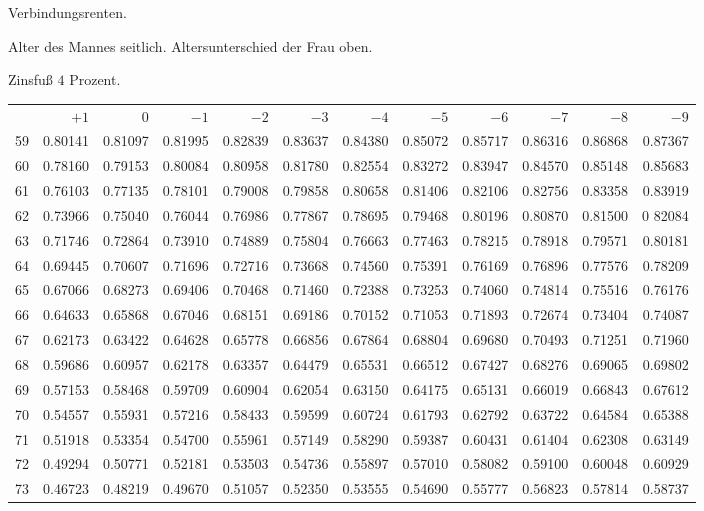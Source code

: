 \clearpage
{}
\begin{center}
Verbindungsrenten.\par\smallskip
Alter des Mannes seitlich. Altersunterschied der Frau oben.\par\smallskip
Zinsfuß \(4\) Prozent.\par\medskip
\fontsize{8}{10}\selectfont\setlength{\tabcolsep}{1.3pt}
\begin{tabular}{|r|rrrrrrrrrrr|}
\hline
&\(+1\)&0&\(-1\)&\(-2\)&\(-3\)&\(-4\)&\(-5\)&\(-6\)&\(-7\)&\(-8\)&\(-9\)\\[8pt]
59&0.80141&0.81097&0.81995&0.82839&0.83637&0.84380&0.85072&0.85717&0.86316&0.86868&0.87367\\
60&0.78160&0.79153&0.80084&0.80958&0.81780&0.82554&0.83272&0.83947&0.84570&0.85148&0.85683\\
61&0.76103&0.77135&0.78101&0.79008&0.79858&0.80658&0.81406&0.82106&0.82756&0.83358&0.83919\\
62&0.73966&0.75040&0.76044&0.76986&0.77867&0.78695&0.79468&0.80196&0.80870&0.81500&0 82084\\
63&0.71746&0.72864&0.73910&0.74889&0.75804&0.76663&0.77463&0.78215&0.78918&0.79571&0.80181\\
64&0.69445&0.70607&0.71696&0.72716&0.73668&0.74560&0.75391&0.76169&0.76896&0.77576&0.78209\\[5pt]
65&0.67066&0.68273&0.69406&0.70468&0.71460&0.72388&0.73253&0.74060&0.74814&0.75516&0.76176\\
66&0.64633&0.65868&0.67046&0.68151&0.69186&0.70152&0.71053&0.71893&0.72674&0.73404&0.74087\\
67&0.62173&0.63422&0.64628&0.65778&0.66856&0.67864&0.68804&0.69680&0.70493&0.71251&0.71960\\
68&0.59686&0.60957&0.62178&0.63357&0.64479&0.65531&0.66512&0.67427&0.68276&0.69065&0.69802\\
69&0.57153&0.58468&0.59709&0.60904&0.62054&0.63150&0.64175&0.65131&0.66019&0.66843&0.67612\\[5pt]
70&0.54557&0.55931&0.57216&0.58433&0.59599&0.60724&0.61793&0.62792&0.63722&0.64584&0.65388\\
71&0.51918&0.53354&0.54700&0.55961&0.57149&0.58290&0.59387&0.60431&0.61404&0.62308&0.63149\\
72&0.49294&0.50771&0.52181&0.53503&0.54736&0.55897&0.57010&0.58082&0.59100&0.60048&0.60929\\
73&0.46723&0.48219&0.49670&0.51057&0.52350&0.53555&0.54690&0.55777&0.56823&0.57814&0.58737\\

\end{tabular}
\end{center}
